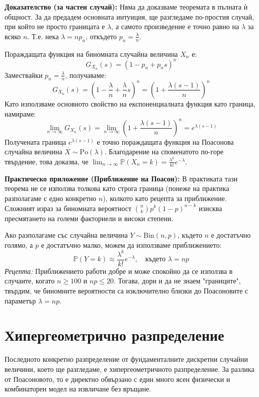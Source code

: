 \documentclass{article}
\begin{document}
\textbf{Доказателство (за частен случай):} 
Няма да доказваме теоремата в пълната ѝ общност. За да предадем основната интуиция, ще разгледаме по-простия случай, при който не просто границата е $\lambda$, а самото произведение е точно равно на $\lambda$ за всяко $n$. Т.е. нека $\lambda = n p_n$, откъдето $p_n = \frac{\lambda}{n}$. 

Пораждащата функция на биномната случайна величина $X_n$ е:
\[
G_{X_n}(s) = \left(1 - p_n + p_n s\right)^n
\]
Замествайки $p_n = \frac{\lambda}{n}$, получаваме:
\[
G_{X_n}(s) = \left(1 - \frac{\lambda}{n} + \frac{\lambda}{n} s\right)^n = \left(1 + \frac{\lambda (s-1)}{n}\right)^n
\]
Като използваме основното свойство на експоненциалната функция като граница, намираме:
\[
\lim_{n \to \infty} G_{X_n}(s) = \lim_{n \to \infty} \left(1 + \frac{\lambda (s-1)}{n}\right)^n = e^{\lambda (s-1)}
\]
Получената граница $e^{\lambda (s-1)}$ е точно пораждащата функция на Поасонова случайна величина $X \sim \text{Po}(\lambda)$. Благодарение на споменатото по-горе твърдение, това доказва, че $\lim_{n \to \infty} \mathbb{P}(X_n = k) = \frac{\lambda^k}{k!} e^{-\lambda}$.

\textbf{Практическо приложение (Приближение на Поасон):}
В практиката тази теорема не се използва толкова като строга граница (понеже на практика разполагаме с едно конкретно $n$), колкото като рецепта за приближение. Сложният израз за биномната вероятност $\binom{n}{k} p^k (1-p)^{n-k}$ изисква пресмятането на големи факториели и високи степени. 

Ако разполагаме със случайна величина $Y \sim \text{Bin}(n, p)$, където $n$ е достатъчно голямо, а $p$ е достатъчно малко, можем да използваме приближението:
\[
\mathbb{P}(Y = k) \approx \frac{\lambda^k}{k!} e^{-\lambda}, \quad \text{където } \lambda = n p
\]
\textit{Рецепта:} Приближението работи добре и може спокойно да се използва в случаите, когато $n \ge 100$ и $np \le 20$. Тогава, дори и да не знаем "границите", твърдим, че биномните вероятности са изключително близки до Поасоновите с параметър $\lambda = np$.


\section{Хипергеометрично разпределение}

Последното конкретно разпределение от фундаменталните дискретни случайни величини, което ще разгледаме, е хипергеометричното разпределение. За разлика от Поасоновото, то е директно обвързано с един много ясен физически и комбинаторен модел на извличане без връщане.
\end{document}
